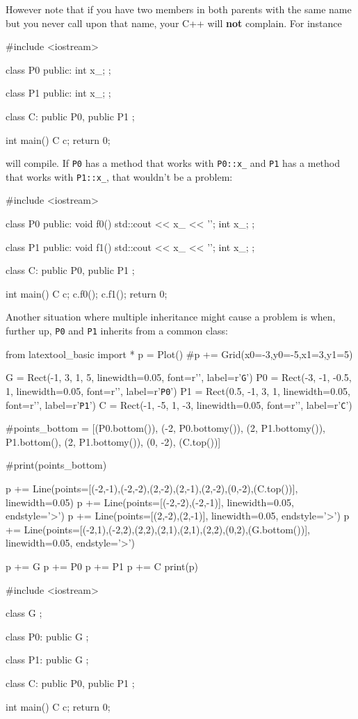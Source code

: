 However note that if you have two members in both parents with the same
name but you never call upon that name, your C++ will \textbf{not}
complain. For instance
\begin{console}
#include <iostream>

class P0
{
public:
        int x_;
};

class P1
{
public:
        int x_;
};

class C: public P0, public P1
{};

int main()
{   
    C c;
    return 0;
}
\end{console}

will compile. If \verb!P0! has a method that works with \verb!P0::x_! and \verb!P1! has a method that works with \verb!P1::x_!, that wouldn't be a problem:
\begin{console}
#include <iostream>

class P0
{
public:
        void f0() { std::cout << x_ << '\n'; }
        int x_;
};

class P1
{
public:
        void f1() { std::cout << x_ << '\n'; }
        int x_;
};

class C: public P0, public P1
{};

int main()
{   
    C c;
    c.f0();
    c.f1();
    return 0;
}
\end{console}

Another situation where multiple inheritance might cause a problem is
when, further up, \verb!P0! and \verb!P1! inherits from a common class:
\begin{python}
from latextool_basic import *
p = Plot()
#p += Grid(x0=-3,y0=-5,x1=3,y1=5)

G = Rect(-1, 3, 1, 5, linewidth=0.05, font=r'\huge', label=r'\texttt{G}')
P0 = Rect(-3, -1, -0.5, 1, linewidth=0.05, font=r'\huge', label=r'\texttt{P0}')
P1 = Rect(0.5, -1, 3, 1, linewidth=0.05, font=r'\huge', label=r'\texttt{P1}')
C = Rect(-1, -5, 1, -3, linewidth=0.05, font=r'\huge', label=r'\texttt{C}')

#points_bottom = [(P0.bottom()), (-2, P0.bottomy()), (2, P1.bottomy()), P1.bottom(), (2, P1.bottomy()), (0, -2), (C.top())]

#print(points_bottom)

p += Line(points=[(-2,-1),(-2,-2),(2,-2),(2,-1),(2,-2),(0,-2),(C.top())], linewidth=0.05)
p += Line(points=[(-2,-2),(-2,-1)], linewidth=0.05, endstyle='>')
p += Line(points=[(2,-2),(2,-1)], linewidth=0.05, endstyle='>')
p += Line(points=[(-2,1),(-2,2),(2,2),(2,1),(2,1),(2,2),(0,2),(G.bottom())], linewidth=0.05, endstyle='>')


p += G
p += P0
p += P1
p += C
print(p)
\end{python}
\begin{console}
#include <iostream>

class G
{};

class P0: public G
{};

class P1: public G
{};

class C: public P0, public P1
{};

int main()
{   
    C c;
    return 0;
}
\end{console}

